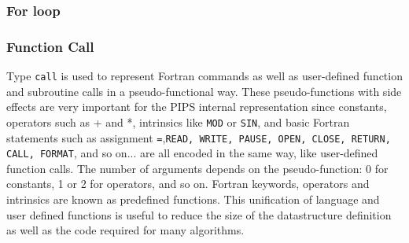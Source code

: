 \documentclass[a4paper]{article}
\begin{document}
\subsubsection{For loop}
\label{subsubsection-forloop}



\subsubsection{Function Call}
\label{subsubsection-call}

{}

Type \verb/call/ is used to represent Fortran commands as well as
user-defined function and subroutine calls in a pseudo-functional
way. These pseudo-functions with side effects are very important for the
PIPS internal representation since constants, operators such as + and *,
intrinsics like \texttt{MOD} or \texttt{SIN}, and basic Fortran statements
such as assignment \texttt{=},\texttt{READ, WRITE, PAUSE, OPEN, CLOSE, RETURN,
CALL, FORMAT}, and so on... are all encoded in the same way, like
user-defined function calls. The number of arguments depends on the
pseudo-function: 0 for constants, 1 or 2 for operators, and so
on. Fortran keywords, operators and intrinsics are known as predefined
functions. This unification of language and user defined functions is
useful to reduce the size of the datastructure definition as well as the
code required for many algorithms.

\begin{comment}
Le domaine \verb/call/ permet de repr�senter les commandes et les
appels de fonctions Fortran sous une forme unique pseudo-fonctionelle.
Ces pseudo-fonctions jouent un r�le important dans notre
repr�sentation interm�diaire puisque les constantes, les op�rateurs
comme + et *, les intrins�ques comme \texttt{MOD} ou \texttt{SIN} et surtout
les commandes (i.e. instructions) Fortran, � commencer par
l'assignation et en continuant avec \texttt{READ, WRITE, PAUSE, OPEN,
CLOSE, RETURN, CALL, FORMAT,}
etc., sont repr�sent�es comme les appels de fonctions d�finies par
l'utilisateur. Le nombre d'arguments de chaque pseudo-fonction varie: 0
pour les constantes, 1 ou 2 pour les op�rateurs, etc. Les commandes
Fortran, les op�rateurs et les intrins�ques sont caract�ris�s par
des pseudo-fonctions pr�d�finies. Cette convention permet de diminuer
consid�rablement la taille de la d�finition de la repr�sentation
ainsi que le volume de code n�cessaire � de nombreux algorithmes.
\end{comment}
\end{document}
